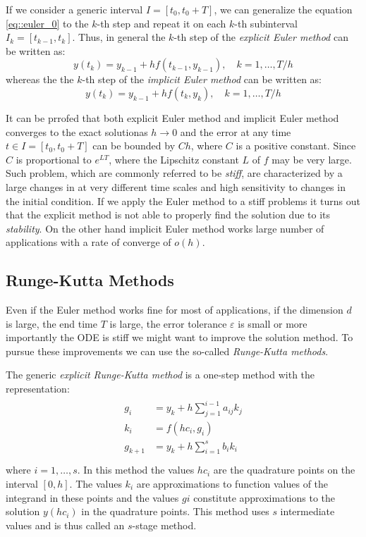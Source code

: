 If we consider a generic interval $I=[t_0, t_0+T]$, we can generalize the equation \eqref{eq::euler_0} to the $k$-th step and repeat it on each $k$-th subinterval $I_k=[t_{k-1}, t_k]$. Thus, in general the $k$-th step of the \textit{explicit Euler method} can be written as:
\begin{equation}
	y(t_k) = y_{k-1} + hf(t_{k-1},y_{k-1}), \quad k=1,\dots,T/h
	\label{eq::euler_explicit}
\end{equation}
whereas the the $k$-th step of the \textit{implicit Euler method} can be written as:
\begin{equation}
	y(t_k) = y_{k-1} + hf(t_{k},y_{k}), \quad k=1,\dots,T/h
	\label{eq::euler_implicit}
\end{equation}

It can be prrofed that both explicit Euler method and implicit Euler method converges to the exact solutionas $h\rightarrow0$ and the error at any time $t \in I = [t_0, t_0+T]$ can be bounded by $Ch$, where $C$ is a positive constant. Since $C$ is proportional to $e^{LT}$, where the Lipschitz constant $L$ of $f$ may be very large. Such problem, which are commonly referred to be \textit{stiff}, are characterized by a large changes in at very different time scales and high sensitivity to changes in the initial condition. If we apply the Euler method to a stiff problems it turns out that the explicit method is not able to properly find the solution due to its \textit{stability}. On the other hand implicit Euler method works large number of applications with a rate of converge of $o(h)$.

\subsection{Runge-Kutta Methods}
Even if the Euler method works fine for most of applications, if the dimension $d$ is large, the end time $T$ is large, the error tolerance $\varepsilon$ is small or more importantly the ODE is stiff we might want to improve the solution method. To pursue these improvements we can use the so-called \textit{Runge-Kutta methods}.

The generic \textit{explicit Runge-Kutta method} is a one-step method with the representation:
\begin{equation}
	\begin{split}
	\begin{aligned}
		g_i &= y_k + h\sum_{j=1}^{i-1}a_{ij}k_j \\
		k_i &= f(hc_i,g_i) \\
		g_{k+1} &= y_k + h\sum_{i=1}^{s}b_ik_i \\
	\end{aligned}
	\end{split}
	\label{eq::rungekutta_explicit}
\end{equation}
where $i=1,\dots,s$. In this method the values $hc_i$ are the quadrature points on the interval $[0, h]$. The values $k_i$ are approximations to function values of the integrand in these points and the values $g i$ constitute approximations to the solution $y(hc_i)$ in the quadrature points. This method uses $s$ intermediate values and is thus called an $s$-stage method.

